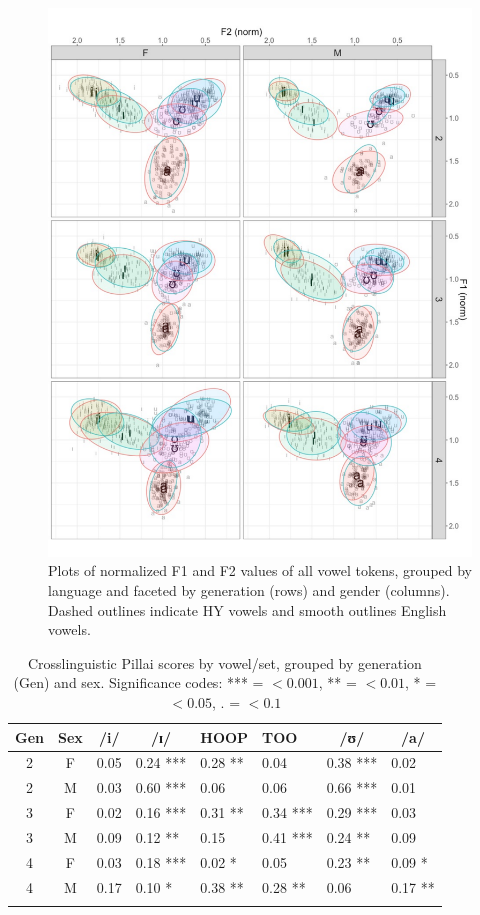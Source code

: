 \documentclass[output=paper]{langsci/langscibook}
\begin{document}
\begin{figure}
\includegraphics[width=\textwidth]{figures/nove-fig7-color.pdf}
\caption{Plots of normalized F1 and F2 values of all vowel tokens, grouped by language and faceted by generation (rows) and gender (columns). Dashed outlines indicate HY vowels and smooth outlines English vowels.}\label{fig:nove:7}
\end{figure}

\begin{table}
\begin{tabular}{ccc *{5}{l}}
\lsptoprule
Gen & Sex & /i/ & \multicolumn{1}{c}{/ɪ/} & HOOP  & TOO  & \multicolumn{1}{c}{/ʊ/}  & \multicolumn{1}{c}{/a/} \\
\midrule
2 & F & 0.05 & 0.24 *** & 0.28 ** & 0.04 & 0.38 *** & 0.02 \\
2 & M & 0.03 & 0.60 *** & 0.06 & 0.06 & 0.66 *** & 0.01  \\
3 & F & 0.02 & 0.16 *** & 0.31 ** & 0.34 *** & 0.29 *** & 0.03 \\
3 & M & 0.09 & 0.12 ** & 0.15 & 0.41 *** & 0.24 ** & 0.09  \\
4 & F & 0.03 & 0.18 *** & 0.02 * & 0.05 & 0.23 ** & 0.09 *\\
4 & M & 0.17 & 0.10 * & 0.38 ** & 0.28 ** & 0.06 & 0.17 **\\
\lspbottomrule
\end{tabular}
\caption{Crosslinguistic Pillai scores by vowel/set, grouped by generation (Gen) and sex. Significance codes: *** = $<0.001$, ** = $<0.01$, * = $<0.05$, . = $<0.1$}
\label{tab:nove:3}
\end{table}
\end{document}
